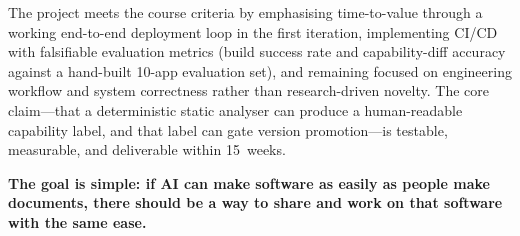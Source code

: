\documentclass[11pt,a4paper]{article}
\begin{document}
The project meets the course criteria by emphasising time-to-value through a working
end-to-end deployment loop in the first iteration, implementing CI/CD with falsifiable
evaluation metrics (build success rate and capability-diff accuracy against a hand-built
10-app evaluation set), and remaining focused on engineering workflow and system
correctness rather than research-driven novelty. The core claim---that a deterministic
static analyser can produce a human-readable capability label, and that label can gate
version promotion---is testable, measurable, and deliverable within 15~weeks.

\bigskip
\noindent\textbf{The goal is simple: if AI can make software as easily as people make
documents, there should be a way to share and work on that software with the same ease.}
\end{document}
